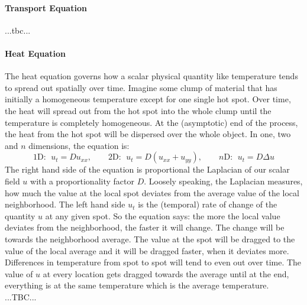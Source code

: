 \paragraph{Transport Equation} ...tbc...


\paragraph{Heat Equation} 
The heat equation governs how a scalar physical quantity like temperature tends to spread out spatially over time. Imagine some clump of material that has initially a homogeneous temperature except for one single hot spot. Over time, the heat will spread out from the hot spot into the whole clump until the temperature is completely homogeneous. At the (asymptotic) end of the process, the heat from the hot spot will be dispersed over the whole object. In one, two and $n$ dimensions, the equation is:
\begin{equation}
1\text{D: } \; u_{t} = D u_{xx} , \qquad 
2\text{D: } \; u_{t} = D (u_{xx} + u_{yy}), \qquad 
n\text{D: } \; u_{t} = D \Delta u
\end{equation}
The right hand side of the equation is proportional the Laplacian of our scalar field $u$ with a proportionality factor $D$. Loosely speaking, the Laplacian measures, how much the value at the local spot deviates from the average value of the local neighborhood. The left hand side $u_t$ is the (temporal) rate of change of the quantity $u$ at any given spot. So the equation says: the more the local value deviates from the neighborhood, the faster it will change. The change will be towards the neighborhood average. The value at the spot will be dragged to the value of the local average and it will be dragged faster, when it deviates more. Differences in temperature from spot to spot will tend to even out over time. The value of $u$ at every location gets dragged towards the average until at the end, everything is at the same temperature which is the average temperature. ...TBC...







